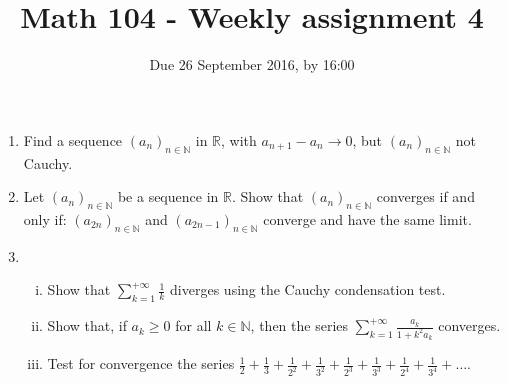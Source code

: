 \documentclass[11pt]{amsart}
\newcommand\R{{\mathbb{R}}}
\newcommand\N{{\mathbb N}}
\theoremstyle{plain}
\theoremstyle{definition}
\numberwithin{equation}{section}
\begin{document}
\title{Math 104 - Weekly assignment 4}
\author{Due 26 September 2016, by 16:00}
\maketitle

\begin{enumerate}

\item Find a sequence $(a_n)_{n\in\N}$ in $\R$, with $a_{n+1}-a_n\rightarrow 0$, but $(a_n)_{n\in\N}$ not Cauchy.
\vspace{0.4in}

\item Let $(a_n)_{n\in\N}$ be a sequence in $\R$. Show that $(a_n)_{n\in\N}$ converges if and only if: $(a_{2n})_{n\in\N}$ and $(a_{2n-1})_{n\in\N}$ converge and have the same limit.
\vspace{0.4in}

\item 
\begin{enumerate}[(i)]
\item Show that $\sum_{k=1}^{+\infty}\frac{1}{k}$ diverges using the Cauchy condensation test.
\vspace{0.1in}
\item Show that, if $a_k\geq 0$ for all $k\in \N$, then the series $\sum_{k=1}^{+\infty}\frac{a_k}{1+k^2a_k}$ converges.
\vspace{0.1in}
\item Test for convergence the series $\frac{1}{2}+\frac{1}{3}+\frac{1}{2^2}+\frac{1}{3^2}+\frac{1}{2^3}+\frac{1}{3^3}+\frac{1}{2^4}+\frac{1}{3^4}+\ldots$.
\end{enumerate}
\vspace{0.4in}


\end{enumerate}
\end{document}
